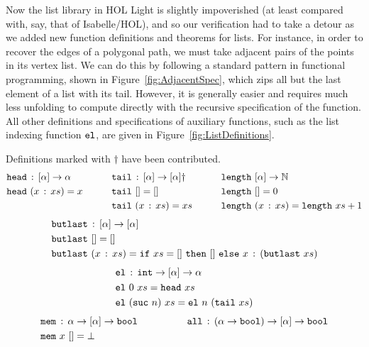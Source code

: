 Now the list library in HOL Light is slightly impoverished (at least compared with, say, that of Isabelle/HOL), and so our verification had to take a detour as we added new function definitions and theorems for lists. For instance, in order to recover the edges of a polygonal path, we must take adjacent pairs of the points in its vertex list. We can do this by following a standard pattern in functional programming, shown in Figure~\ref{fig:AdjacentSpec}, which zips all but the last element of a list with its tail. However, it is generally easier and requires much less unfolding to compute directly with the recursive specification of the function. All other definitions and specifications of auxiliary functions, such as the list indexing function $\texttt{el}$, are given in Figure~\ref{fig:ListDefinitions}.

\begin{boxedfigure}
Definitions marked with $\dag$ have been contributed.
\begin{alignat*}{3}
  & \texttt{head}\,:\,[\alpha] \rightarrow \alpha &\qquad
  & \texttt{tail}\,:\,[\alpha] \rightarrow [\alpha]\dag &\qquad
  & \texttt{length}\ [\alpha]\rightarrow \mathbb{N}\\
  & \texttt{head}\ (x\,:\,xs) = x &\qquad
  & \texttt{tail}\ [] = [] &\qquad
  & \texttt{length}\ [] = 0\\
  & &\qquad
  &\texttt{tail}\ (x\,:\,xs) = xs &\qquad
  & \texttt{length}\ (x\,:\,xs) = \texttt{length}\ xs + 1
\end{alignat*}
\begin{align*}
  &\code{butlast}\,:\,[\alpha] \rightarrow [\alpha]\\
  &\code{butlast}\ [] = []\\
  &\code{butlast}\ (\cons{x}{xs}) = \code{if}\ xs=[]\ \code{then}\ []\ \code{else}\ \cons{x}{(\code{butlast}\ xs)}
\end{align*}
\begin{align*}
  &\texttt{el}\,:\,\texttt{int} \rightarrow [\alpha] \rightarrow \alpha\\
  &\texttt{el}\ 0\ xs = \texttt{head}\ xs\\
  &\texttt{el}\ (\texttt{suc}\ n)\ xs = \texttt{el}\ n\ (\texttt{tail}\ xs)
\end{align*}
\begin{align*}
  & \code{mem}\,:\,\alpha \rightarrow [\alpha] \rightarrow \code{bool} &\qquad\qquad
  & \code{all}\,:\,(\alpha\rightarrow\code{bool}) \rightarrow [\alpha] \rightarrow \code{bool}\\
  & \code{mem}\ x\ [] = \bot &\qquad\qquad

\end{align*}
\end{boxedfigure}
